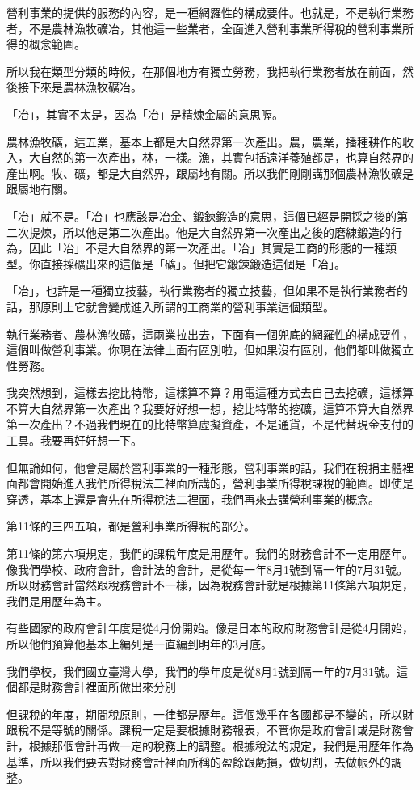 \documentclass[oneside,sub3section]{ctexbook}
\begin{document}
營利事業的提供的服務的內容，是一種網羅性的構成要件。也就是，不是執行業務者，不是農林漁牧礦冶，其他這一些業者，全面進入營利事業所得稅的營利事業所得的概念範圍。

所以我在類型分類的時候，在那個地方有獨立勞務，我把執行業務者放在前面，然後接下來是農林漁牧礦冶。

「冶」，其實不太是，因為「冶」是精煉金屬的意思喔。

農林漁牧礦，這五業，基本上都是大自然界第一次產出。農，農業，播種耕作的收入，大自然的第一次產出，林，一樣。漁，其實包括遠洋養殖都是，也算自然界的產出啊。牧、礦，都是大自然界，跟屬地有關。所以我們剛剛講那個農林漁牧礦是跟屬地有關。

「冶」就不是。「冶」也應該是冶金、鍛鍊鍛造的意思，這個已經是開採之後的第二次提煉，所以他是第二次產出。他是大自然界第一次產出之後的磨練鍛造的行為，因此「冶」不是大自然界的第一次產出。「冶」其實是工商的形態的一種類型。你直接採礦出來的這個是「礦」。但把它鍛鍊鍛造這個是「冶」。

「冶」，也許是一種獨立技藝，執行業務者的獨立技藝，但如果不是執行業務者的話，那原則上它就會變成進入所謂的工商業的營利事業這個類型。

執行業務者、農林漁牧礦，這兩業拉出去，下面有一個兜底的網羅性的構成要件，這個叫做營利事業。你現在法律上面有區別啦，但如果沒有區別，他們都叫做獨立性勞務。

我突然想到，這樣去挖比特幣，這樣算不算？用電這種方式去自己去挖礦，這樣算不算大自然界第一次產出？我要好好想一想，挖比特幣的挖礦，這算不算大自然界第一次產出？不過我們現在的比特幣算虛擬資產，不是通貨，不是代替現金支付的工具。我要再好好想一下。

但無論如何，他會是屬於營利事業的一種形態，營利事業的話，我們在稅捐主體裡面都會開始進入我們所得稅法二裡面所講的，營利事業所得稅課稅的範圍。即使是穿透，基本上還是會先在所得稅法二裡面，我們再來去講營利事業的概念。

第11條的三四五項，都是營利事業所得稅的部分。

第11條的第六項規定，我們的課稅年度是用歷年。我們的財務會計不一定用歷年。像我們學校、政府會計，會計法的會計，是從每一年8月1號到隔一年的7月31號。所以財務會計當然跟稅務會計不一樣，因為稅務會計就是根據第11條第六項規定，我們是用歷年為主。

有些國家的政府會計年度是從4月份開始。像是日本的政府財務會計是從4月開始，所以他們預算他基本上編列是一直編到明年的3月底。

我們學校，我們國立臺灣大學，我們的學年度是從8月1號到隔一年的7月31號。這個都是財務會計裡面所做出來分別

但課稅的年度，期間稅原則，一律都是歷年。這個幾乎在各國都是不變的，所以財跟稅不是等號的關係。課稅一定是要根據財務報表，不管你是政府會計或是財務會計，根據那個會計再做一定的稅務上的調整。根據稅法的規定，我們是用歷年作為基準，所以我們要去對財務會計裡面所稱的盈餘跟虧損，做切割，去做帳外的調整。
\end{document}
